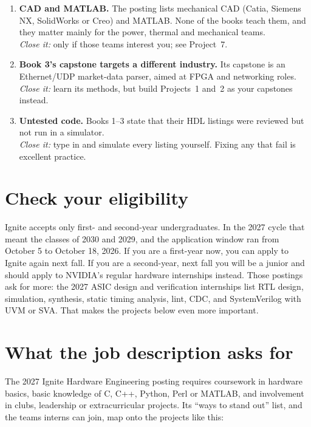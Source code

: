 \begin{enumerate}
  \item \textbf{CAD and MATLAB.} The posting lists mechanical CAD (Catia, Siemens NX, SolidWorks or Creo) and MATLAB. None of the books teach them, and they matter mainly for the power, thermal and mechanical teams.\\
  \emph{Close it:} only if those teams interest you; see Project~7.

  \item \textbf{Book 3's capstone targets a different industry.} Its capstone is an Ethernet/UDP market-data parser, aimed at FPGA and networking roles.\\
  \emph{Close it:} learn its methods, but build Projects~1 and~2 as your capstones instead.

  \item \textbf{Untested code.} Books 1--3 state that their HDL listings were reviewed but not run in a simulator.\\
  \emph{Close it:} type in and simulate every listing yourself. Fixing any that fail is excellent practice.
\end{enumerate}

\section{Check your eligibility}

Ignite accepts only first- and second-year undergraduates. In the 2027 cycle that meant the classes of 2030 and 2029, and the application window ran from October 5 to October 18, 2026. If you are a first-year now, you can apply to Ignite again next fall. If you are a second-year, next fall you will be a junior and should apply to NVIDIA's regular hardware internships instead. Those postings ask for more: the 2027 ASIC design and verification internships list RTL design, simulation, synthesis, static timing analysis, lint, CDC, and SystemVerilog with UVM or SVA. That makes the projects below even more important.

\section{What the job description asks for}

The 2027 Ignite Hardware Engineering posting requires coursework in hardware basics, basic knowledge of C, C++, Python, Perl or MATLAB, and involvement in clubs, leadership or extracurricular projects. Its ``ways to stand out'' list, and the teams interns can join, map onto the projects like this:

